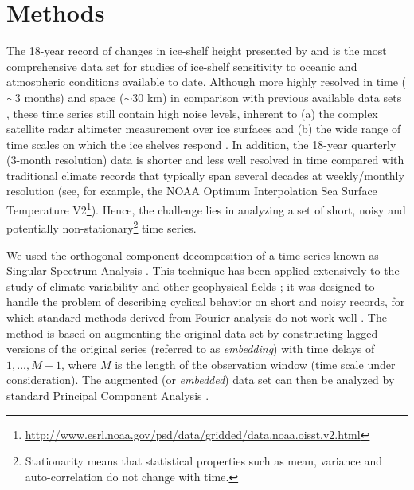 \section{Methods}

The 18-year record of changes in ice-shelf height presented by \textcite{Paolo2015a} and \citeyearpar{Paolo2015} is the most comprehensive data set for studies of ice-shelf sensitivity to oceanic and atmospheric conditions available to date. Although more highly resolved in time ($\sim$3 months) and space ($\sim$30 km) in comparison with previous available data sets \parencite[e.g.,][]{Shepherd2010, Pritchard2012}, these time series still contain high noise levels, inherent to (a) the complex satellite radar altimeter measurement over ice surfaces \parencite{Paolo2015a, Davis1993, Arthern2001, Wingham2010, Remy2012} and (b) the wide range of time scales on which the ice shelves respond \parencite{Paolo2015a, Padman2003, Holland2015, Dutrieux2014}. In addition, the 18-year quarterly (3-month resolution) data is shorter and less well resolved in time compared with traditional climate records that typically span several decades at weekly/monthly resolution (see, for example, the NOAA Optimum Interpolation Sea Surface Temperature V2\footnote{\url{http://www.esrl.noaa.gov/psd/data/gridded/data.noaa.oisst.v2.html}}). Hence, the challenge lies in analyzing a set of short, noisy and potentially non-stationary\footnote{Stationarity means that statistical properties such as mean, variance and auto-correlation do not change with time.} time series.

We used the orthogonal-component decomposition of a time series known as Singular Spectrum Analysis \parencite[SSA;][]{Vautard1992, Golyandina2013, Elsner1996}. This technique has been applied extensively to the study of climate variability and other geophysical fields \parencite[][and references therein]{Ghil2002}; it was designed to handle the problem of describing cyclical behavior on short and noisy records, for which standard methods derived from Fourier analysis do not work well \parencite{Vautard1989, Ghil1991, Vautard1992, Groth2011}. The method is based on augmenting the original data set by constructing lagged versions of the original series (referred to as \emph{embedding}) with time delays of $1,...,M-1$, where $M$ is the length of the observation window (time scale under consideration). The augmented (or \emph{embedded}) data set can then be analyzed by standard Principal Component Analysis \parencite[PCA;][]{Jolliffe2002}.

